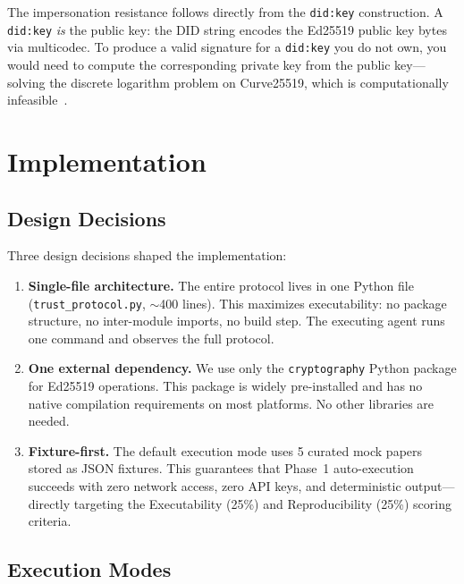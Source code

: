 \documentclass[11pt]{article}
\newcommand{\didkey}{\texttt{did:key}}
\begin{document}
The impersonation resistance follows directly from the \didkey{} construction. A \didkey{} \emph{is} the public key: the DID string encodes the Ed25519 public key bytes via multicodec. To produce a valid signature for a \didkey{} you do not own, you would need to compute the corresponding private key from the public key---solving the discrete logarithm problem on Curve25519, which is computationally infeasible~\cite{ed25519}.

\section{Implementation}
\label{sec:implementation}

\subsection{Design Decisions}

Three design decisions shaped the implementation:

\begin{enumerate}[nosep,leftmargin=1.5em]
  \item \textbf{Single-file architecture.} The entire protocol lives in one Python file (\texttt{trust\_protocol.py}, ${\sim}$400 lines). This maximizes executability: no package structure, no inter-module imports, no build step. The executing agent runs one command and observes the full protocol.
  \item \textbf{One external dependency.} We use only the \texttt{cryptography} Python package for Ed25519 operations. This package is widely pre-installed and has no native compilation requirements on most platforms. No other libraries are needed.
  \item \textbf{Fixture-first.} The default execution mode uses 5 curated mock papers stored as JSON fixtures. This guarantees that Phase~1 auto-execution succeeds with zero network access, zero API keys, and deterministic output---directly targeting the Executability (25\%) and Reproducibility (25\%) scoring criteria.
\end{enumerate}

\subsection{Execution Modes}
\end{document}
